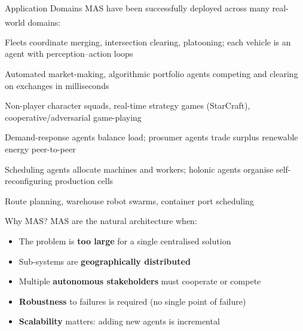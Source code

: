 \begin{v3topic}{Application Domains}
    MAS have been successfully deployed across many real-world
    domains:\textsuperscript{\cite[][p.~6]{weissMultiagentSystems2013}}
    \begin{description}[leftmargin=0.6cm, labelindent=0pt]
        \item[\textbf{Autonomous vehicles}] Fleets coordinate merging, intersection clearing,
              platooning; each vehicle is an agent with perception--action loops
        \item[\textbf{Electronic trading}] Automated market-making, algorithmic portfolio agents
              competing and clearing on exchanges in milliseconds
        \item[\textbf{Game AI}] Non-player character squads, real-time strategy games (StarCraft),
              cooperative/adversarial game-playing
        \item[\textbf{Smart grid}] Demand-response agents balance load; prosumer agents trade
              surplus renewable energy peer-to-peer
        \item[\textbf{Manufacturing}] Scheduling agents allocate machines and workers; holonic
              agents organise self-reconfiguring production cells
        \item[\textbf{Logistics}] Route planning, warehouse robot swarms, container port scheduling
    \end{description}

\end{v3topic}
\begin{v3topic}{Why MAS?}
    MAS are the natural architecture when:
    \begin{itemize}
        \item The problem is \textbf{too large} for a single centralised solution
        \item Sub-systems are \textbf{geographically distributed}
        \item Multiple \textbf{autonomous stakeholders} must cooperate or compete
        \item \textbf{Robustness} to failures is required (no single point of failure)
        \item \textbf{Scalability} matters: adding new agents is incremental
    \end{itemize}
    \textsuperscript{\cite[][p.~3]{wooldridgeIntroductionMultiAgentSystems2009}}

\end{v3topic}

